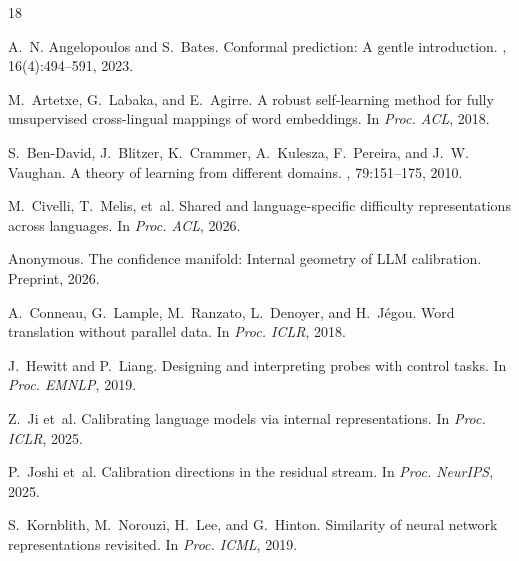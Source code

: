 \documentclass[11pt,a4paper]{article}
\begin{document}
\begin{thebibliography}{18}

A.~N. Angelopoulos and S.~Bates.
\newblock Conformal prediction: A gentle introduction.
, 16(4):494--591, 2023.

M.~Artetxe, G.~Labaka, and E.~Agirre.
\newblock A robust self-learning method for fully unsupervised cross-lingual mappings of word embeddings.
\newblock In {\em Proc. ACL}, 2018.

S.~Ben-David, J.~Blitzer, K.~Crammer, A.~Kulesza, F.~Pereira, and J.~W. Vaughan.
\newblock A theory of learning from different domains.
, 79:151--175, 2010.

M.~Civelli, T.~Melis, et~al.
\newblock Shared and language-specific difficulty representations across languages.
\newblock In {\em Proc. ACL}, 2026.

{Anonymous}.
\newblock The confidence manifold: Internal geometry of LLM calibration.
\newblock Preprint, 2026.

A.~Conneau, G.~Lample, M.~Ranzato, L.~Denoyer, and H.~J\'{e}gou.
\newblock Word translation without parallel data.
\newblock In {\em Proc. ICLR}, 2018.

J.~Hewitt and P.~Liang.
\newblock Designing and interpreting probes with control tasks.
\newblock In {\em Proc. EMNLP}, 2019.

Z.~Ji et~al.
\newblock Calibrating language models via internal representations.
\newblock In {\em Proc. ICLR}, 2025.

P.~Joshi et~al.
\newblock Calibration directions in the residual stream.
\newblock In {\em Proc. NeurIPS}, 2025.

S.~Kornblith, M.~Norouzi, H.~Lee, and G.~Hinton.
\newblock Similarity of neural network representations revisited.
\newblock In {\em Proc. ICML}, 2019.


\end{thebibliography}
\end{document}
